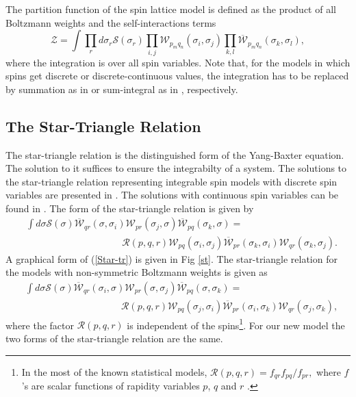 \documentclass[a4paper,11pt]{article}%
\numberwithin{equation}{section}
\begin{document}
The partition function of the spin lattice model is defined as the product of all Boltzmann weights and the self-interactions terms
\begin{equation}\label{Partition Function}
     \mathcal{Z}=  \int \prod_r d\sigma_r \mathcal{S}(  \sigma_r ) \prod_{i,j}\mathcal{W}_ {p_mq_n} (  \sigma _{i} ,  \sigma _{j} ) \prod_{k,l}\overline{\mathcal{W}}_ {p_mq_n}  (  \sigma _{k} ,  \sigma _{l} ), 
\end{equation} 
 where the integration is over all spin variables. Note that, for the models in which spins get discrete or discrete-continuous values, the integration has to be replaced by summation as in \cite{Baxter:1987eq}  or sum-integral as in \cite{Kels:2015bda}, respectively.



\subsection{The Star-Triangle Relation }\label{tsr}
\linespread{0.5}
The star-triangle relation is the distinguished form of the Yang-Baxter equation. The solution to it suffices to ensure the integrabilty of a system. The solutions to the star-triangle relation representing  integrable spin models with discrete spin variables are presented in \cite{Kashiwara:1986tu,vonGehlen:1984bi,AuYang:1987zc,Baxter:1987eq}. The solutions with continuous spin variables can be found in \cite{Zamolodchikov:1980mb,Bazhanov:2007mh,Stroganov:1979et,Zamolodchikov:1979ba,Baxter:1982xp}.  The form of the star-triangle relation is given by
\begin{align} \nonumber
& \int d \sigma \mathcal{S}(\sigma)  \overline{\mathcal{W}}_{qr}(\sigma,\sigma_i)\mathcal{W}_{pr}(\sigma_j,\sigma) \overline{\mathcal{W}}_{pq}(\sigma_k,\sigma) =\\
& \qquad \qquad \qquad \qquad \qquad  \mathcal{R}(p,q,r)\mathcal{W}_{pq}(\sigma_i,\sigma_j) \overline{\mathcal{W}}_{pr}(\sigma_k,\sigma_i)\mathcal{W}_{qr}(\sigma_k,\sigma_j).
\end{align}\label{Star-tr}
A graphical form of (\ref{Star-tr}) is given in Fig \ref{st}. The star-triangle relation for the models with non-symmetric Boltzmann weights is given as 
\begin{align} \nonumber
& \int d \sigma \mathcal{S}(\sigma)  \overline{\mathcal{W}}_{qr}(\sigma_i,\sigma)\mathcal{W}_{pr}(\sigma,\sigma_j) \overline{\mathcal{W}}_{pq}(\sigma,\sigma_k) =\\
& \qquad \qquad \qquad \qquad \qquad \mathcal{R}(p,q,r)\mathcal{W}_{pq}(\sigma_j,\sigma_i) \overline{\mathcal{W}}_{pr}(\sigma_i,\sigma_k)\mathcal{W}_{qr}(\sigma_j,\sigma_k),
\end{align}
where the factor $\mathcal{R}(p,q,r)$ is independent of the spins\footnote{ In the most of the known statistical models,  $ \mathcal{R}(p,q,r)=f_{qr}f_{pq}/f_{pr},
$
where $f$'s are scalar functions of rapidity variables $p$, $q$ and $r$ \cite{Bax02rip}.}. For our new model the two forms of the star-triangle relation are the same.
\end{document}
